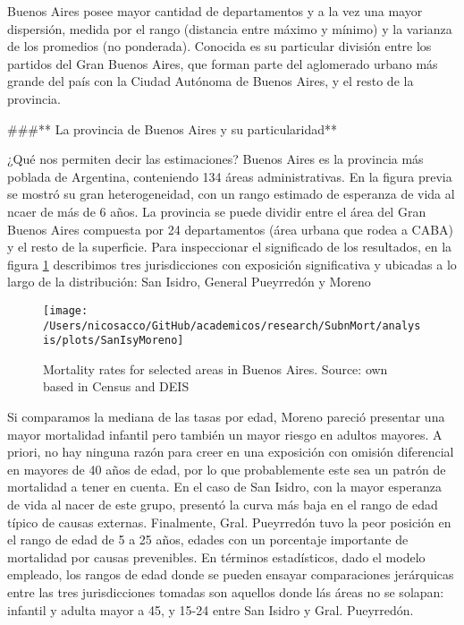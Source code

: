 \documentclass[12pt,]{article}
\begin{document}
Buenos Aires posee mayor cantidad de departamentos y a la vez una mayor
dispersión, medida por el rango (distancia entre máximo y mínimo) y la
varianza de los promedios (no ponderada). Conocida es su particular
división entre los partidos del Gran Buenos Aires, que forman parte del
aglomerado urbano más grande del país con la Ciudad Autónoma de Buenos
Aires, y el resto de la provincia.

\#\#\#** La provincia de Buenos Aires y su particularidad**

¿Qué nos permiten decir las estimaciones? Buenos Aires es la provincia
más poblada de Argentina, conteniendo 134 áreas administrativas. En la
figura previa se mostró su gran heterogeneidad, con un rango estimado de
esperanza de vida al ncaer de más de 6 años. La provincia se puede
dividir entre el área del Gran Buenos Aires compuesta por 24
departamentos (área urbana que rodea a CABA) y el resto de la
superficie. Para inspeccionar el significado de los resultados, en la
figura \ref{fig:dptosBsAs} describimos tres jurisdicciones con
exposición significativa y ubicadas a lo largo de la distribución: San
Isidro, General Pueyrredón y Moreno

\begin{figure}

{\centering \texttt{[image: /Users/nicosacco/GitHub/academicos/research/SubnMort/analysis/plots/SanIsyMoreno]} 

}

\caption{Mortality rates for selected areas in Buenos Aires. Source: own based in Census and DEIS}\label{fig:dptosBsAs}
\end{figure}

Si comparamos la mediana de las tasas por edad, Moreno pareció presentar
una mayor mortalidad infantil pero también un mayor riesgo en adultos
mayores. A priori, no hay ninguna razón para creer en una exposición con
omisión diferencial en mayores de 40 años de edad, por lo que
probablemente este sea un patrón de mortalidad a tener en cuenta. En el
caso de San Isidro, con la mayor esperanza de vida al nacer de este
grupo, presentó la curva más baja en el rango de edad típico de causas
externas. Finalmente, Gral. Pueyrredón tuvo la peor posición en el rango
de edad de 5 a 25 años, edades con un porcentaje importante de
mortalidad por causas prevenibles. En términos estadísticos, dado el
modelo empleado, los rangos de edad donde se pueden ensayar
comparaciones jerárquicas entre las tres jurisdicciones tomadas son
aquellos donde lás áreas no se solapan: infantil y adulta mayor a 45, y
15-24 entre San Isidro y Gral. Pueyrredón.
\end{document}
